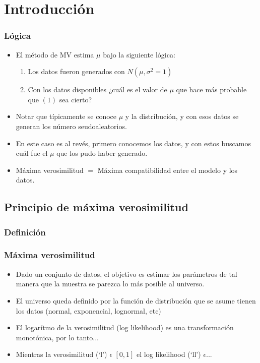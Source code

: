\section{Introducción}
\begin{frame}[fragile]
	\frametitle{Lógica}
	\begin{itemize}
		\item El método de MV estima $\mu$ bajo la siguiente lógica:
		
		\begin{enumerate}
			\item Los datos fueron generados con $N(\mu,\sigma^2=1)$
			\item Con los datos disponibles ¿cuál es el valor de $\mu$ que hace más probable que $(1)$ sea cierto? 
		\end{enumerate}
		
		\item Notar que típicamente se conoce $\mu$ y la distribución, y con esos datos se generan los número seudoaleatorios.
		\item En este caso es al revés, primero conocemos los datos, y con estos buscamos cuál fue el $\mu$ que los pudo haber generado.
		\item Máxima verosimilitud $=$ Máxima compatibilidad entre el modelo y los datos.
	\end{itemize}
\end{frame}

\subsection{Principio de máxima verosimilitud}

\subsubsection{Definición}

\begin{frame}[fragile]
	\frametitle{Máxima verosimilitud}
	\begin{itemize}
		\item Dado un conjunto de datos, el objetivo es estimar los
		parámetros de tal manera que la muestra se parezca lo más
		posible al universo.
		\item El universo queda definido por la función de distribución que se asume tienen los datos (normal,
		exponencial, lognormal, etc)
		\item El logarítmo de la verosimilitud (log likelihood) es una transformación
		monotónica, por lo tanto...
		\item Mientras la verosimilitud (`l') $\epsilon$ $[0,1]$ el log likelihood (`ll') $ \epsilon ...$
	\end{itemize}
\end{frame}

